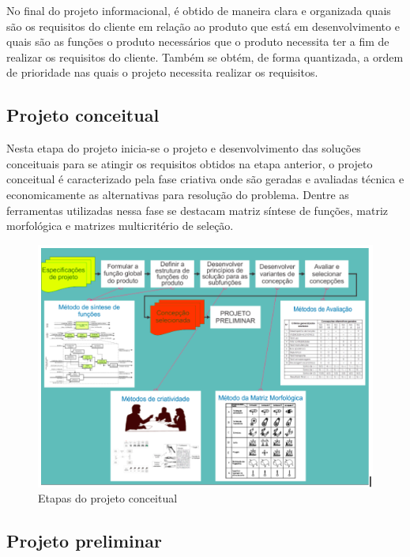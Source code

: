 No final do projeto informacional, é obtido de maneira clara e organizada quais são os requisitos do cliente em relação ao produto que está em desenvolvimento e quais são as
funções o produto necessários que o produto necessita ter a fim de realizar os requisitos do cliente. Também se obtém, de forma quantizada, a ordem de prioridade nas quais
o projeto necessita realizar os requisitos.

\subsection{Projeto conceitual}

Nesta etapa do projeto inicia-se o projeto e desenvolvimento das soluções conceituais para se atingir os requisitos obtidos na etapa anterior, o projeto conceitual é
caracterizado pela fase criativa onde são geradas e avaliadas técnica e economicamente as alternativas para resolução do problema. Dentre as ferramentas utilizadas nessa
fase se destacam matriz síntese de funções, matriz morfológica e matrizes multicritério de seleção. \autocite{PRODIP}

\begin{figure}[htb]
	\caption{\label{fig:1190}Etapas do projeto conceitual}
	\begin{center}
		\includegraphics[width=\textwidth]{pictures/1190.png}
	\end{center}
\end{figure}

\subsection{Projeto preliminar}

